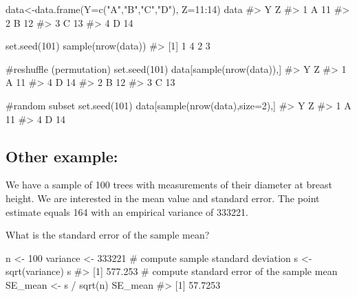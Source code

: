 \documentclass[
  letterpaper,
  DIV=11,
  numbers=noendperiod]{scrreprt}
\newenvironment{Shaded}{\begin{snugshade}}{\end{snugshade}}
\newcommand{\AttributeTok}[1]{\textcolor[rgb]{0.40,0.45,0.13}{#1}}
\newcommand{\CommentTok}[1]{\textcolor[rgb]{0.37,0.37,0.37}{#1}}
\newcommand{\DecValTok}[1]{\textcolor[rgb]{0.68,0.00,0.00}{#1}}
\newcommand{\FunctionTok}[1]{\textcolor[rgb]{0.28,0.35,0.67}{#1}}
\newcommand{\NormalTok}[1]{\textcolor[rgb]{0.00,0.23,0.31}{#1}}
\newcommand{\OtherTok}[1]{\textcolor[rgb]{0.00,0.23,0.31}{#1}}
\newcommand{\SpecialCharTok}[1]{\textcolor[rgb]{0.37,0.37,0.37}{#1}}
\newcommand{\StringTok}[1]{\textcolor[rgb]{0.13,0.47,0.30}{#1}}
\begin{document}
\begin{Shaded}
\begin{Highlighting}[]
\NormalTok{data}\OtherTok{\textless{}{-}}\FunctionTok{data.frame}\NormalTok{(}\AttributeTok{Y=}\FunctionTok{c}\NormalTok{(}\StringTok{"A"}\NormalTok{,}\StringTok{"B"}\NormalTok{,}\StringTok{"C"}\NormalTok{,}\StringTok{"D"}\NormalTok{), }\AttributeTok{Z=}\DecValTok{11}\SpecialCharTok{:}\DecValTok{14}\NormalTok{)}
\NormalTok{data}
\CommentTok{\#\textgreater{}   Y  Z}
\CommentTok{\#\textgreater{} 1 A 11}
\CommentTok{\#\textgreater{} 2 B 12}
\CommentTok{\#\textgreater{} 3 C 13}
\CommentTok{\#\textgreater{} 4 D 14}

\FunctionTok{set.seed}\NormalTok{(}\DecValTok{101}\NormalTok{)}
\FunctionTok{sample}\NormalTok{(}\FunctionTok{nrow}\NormalTok{(data))}
\CommentTok{\#\textgreater{} [1] 1 4 2 3}

\CommentTok{\#reshuffle (permutation)}
\FunctionTok{set.seed}\NormalTok{(}\DecValTok{101}\NormalTok{)}
\NormalTok{data[}\FunctionTok{sample}\NormalTok{(}\FunctionTok{nrow}\NormalTok{(data)),]}
\CommentTok{\#\textgreater{}   Y  Z}
\CommentTok{\#\textgreater{} 1 A 11}
\CommentTok{\#\textgreater{} 4 D 14}
\CommentTok{\#\textgreater{} 2 B 12}
\CommentTok{\#\textgreater{} 3 C 13}

\CommentTok{\#random subset}
\FunctionTok{set.seed}\NormalTok{(}\DecValTok{101}\NormalTok{)}
\NormalTok{data[}\FunctionTok{sample}\NormalTok{(}\FunctionTok{nrow}\NormalTok{(data),}\AttributeTok{size=}\DecValTok{2}\NormalTok{),]}
\CommentTok{\#\textgreater{}   Y  Z}
\CommentTok{\#\textgreater{} 1 A 11}
\CommentTok{\#\textgreater{} 4 D 14}
\end{Highlighting}
\end{Shaded}

\subsection{Other example:}\label{other-example}

We have a sample of 100 trees with measurements of their diameter at
breast height. We are interested in the mean value and standard error.
The point estimate equals 164 with an empirical variance of 333221.

What is the standard error of the sample mean?

\begin{Shaded}
\begin{Highlighting}[]
\NormalTok{n }\OtherTok{\textless{}{-}} \DecValTok{100}
\NormalTok{variance }\OtherTok{\textless{}{-}} \DecValTok{333221}
\CommentTok{\# compute sample standard deviation}
\NormalTok{s }\OtherTok{\textless{}{-}} \FunctionTok{sqrt}\NormalTok{(variance)}
\NormalTok{s}
\CommentTok{\#\textgreater{} [1] 577.253}
\CommentTok{\# compute standard error of the sample mean}
\NormalTok{SE\_mean }\OtherTok{\textless{}{-}}\NormalTok{ s }\SpecialCharTok{/} \FunctionTok{sqrt}\NormalTok{(n)}
\NormalTok{SE\_mean}
\CommentTok{\#\textgreater{} [1] 57.7253}
\end{Highlighting}
\end{Shaded}
\end{document}
